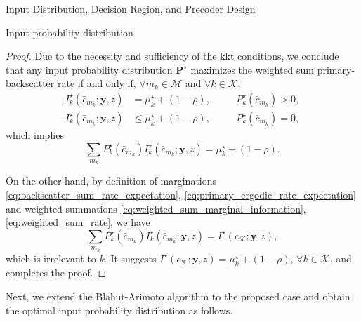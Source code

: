 \documentclass[journal]{IEEEtran}
\begin{document}
\begin{section}{Input Distribution, Decision Region, and Precoder Design}
\begin{subsection}{Input probability distribution}
\begin{proof}
				Due to the necessity and sufficiency of the \gls{kkt} conditions, we conclude that any input probability distribution $\boldsymbol{P}^{\star}$ maximizes the weighted sum primary-backscatter rate if and only if, $\forall m_k \in \mathcal{M}$ and $\forall k \in \mathcal{K}$,
				\begin{subequations}
					\begin{alignat}{2}
						I_k^{\star}(\bar{c}_{m_k};\boldsymbol{y},z) & = \mu_k^{\star} + (1 - \rho), \quad && P_k^{\star}(\bar{c}_{m_k}) > 0,\label{eq:probable_states_marginal}\\
						I_k^{\star}(\bar{c}_{m_k};\boldsymbol{y},z) & \le \mu_k^{\star} + (1 - \rho), \quad && P_k^{\star}(\bar{c}_{m_k}) = 0,\label{eq:dropped_states_marginal}
					\end{alignat}
				\end{subequations}
				which implies
				\begin{equation}
					\sum_{m_k} P_k^{\star}(\bar{c}_{m_k}) I_k^{\star}(\bar{c}_{m_k};\boldsymbol{y},z) = \mu_k^{\star} + (1 - \rho).
				\end{equation}

				On the other hand, by definition of marginations \eqref{eq:backscatter_sum_rate_expectation}, \eqref{eq:primary_ergodic_rate_expectation} and weighted summations \eqref{eq:weighted_sum_marginal_information}, \eqref{eq:weighted_sum_rate}, we have
				\begin{equation}
					\sum_{m_k} P_k^{\star}(\bar{c}_{m_k}) I_k^{\star}(\bar{c}_{m_k};\boldsymbol{y},z) = I^{\star}(c_{\mathcal{K}};\boldsymbol{y},z),
				\end{equation}
				which is irrelevant to $k$. It suggests $I^{\star}(c_{\mathcal{K}};\boldsymbol{y},z) = \mu_k^{\star} + (1 - \rho)$, $\forall k \in \mathcal{K}$, and completes the proof.
			\end{proof}

			Next, we extend the Blahut-Arimoto algorithm to the proposed case and obtain the optimal input probability distribution as follows.


\end{subsection}
\end{section}
\end{document}
